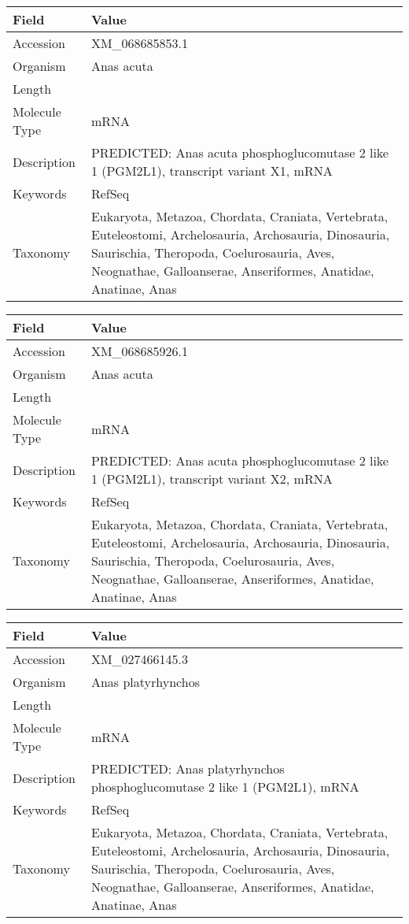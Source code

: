 \documentclass[10pt]{article}
\begin{document}
\vspace{1em}
{\footnotesize
\begin{longtable}{>{\raggedright\arraybackslash}p{4.5cm} >{\raggedright\arraybackslash}p{11.5cm}}
\textbf{Field} & \textbf{Value} \\
\hline
Accession & XM\_068685853.1 \\
Organism & Anas acuta \\
Length & 6369 \\
Molecule Type & mRNA \\
Description & PREDICTED: Anas acuta phosphoglucomutase 2 like 1 (PGM2L1), transcript variant X1, mRNA \\
Keywords & RefSeq \\
Taxonomy & Eukaryota, Metazoa, Chordata, Craniata, Vertebrata, Euteleostomi, Archelosauria, Archosauria, Dinosauria, Saurischia, Theropoda, Coelurosauria, Aves, Neognathae, Galloanserae, Anseriformes, Anatidae, Anatinae, Anas \\
\end{longtable}
}

\vspace{1em}
{\footnotesize
\begin{longtable}{>{\raggedright\arraybackslash}p{4.5cm} >{\raggedright\arraybackslash}p{11.5cm}}
\textbf{Field} & \textbf{Value} \\
\hline
Accession & XM\_068685926.1 \\
Organism & Anas acuta \\
Length & 6180 \\
Molecule Type & mRNA \\
Description & PREDICTED: Anas acuta phosphoglucomutase 2 like 1 (PGM2L1), transcript variant X2, mRNA \\
Keywords & RefSeq \\
Taxonomy & Eukaryota, Metazoa, Chordata, Craniata, Vertebrata, Euteleostomi, Archelosauria, Archosauria, Dinosauria, Saurischia, Theropoda, Coelurosauria, Aves, Neognathae, Galloanserae, Anseriformes, Anatidae, Anatinae, Anas \\
\end{longtable}
}

\vspace{1em}
{\footnotesize
\begin{longtable}{>{\raggedright\arraybackslash}p{4.5cm} >{\raggedright\arraybackslash}p{11.5cm}}
\textbf{Field} & \textbf{Value} \\
\hline
Accession & XM\_027466145.3 \\
Organism & Anas platyrhynchos \\
Length & 6371 \\
Molecule Type & mRNA \\
Description & PREDICTED: Anas platyrhynchos phosphoglucomutase 2 like 1 (PGM2L1), mRNA \\
Keywords & RefSeq \\
Taxonomy & Eukaryota, Metazoa, Chordata, Craniata, Vertebrata, Euteleostomi, Archelosauria, Archosauria, Dinosauria, Saurischia, Theropoda, Coelurosauria, Aves, Neognathae, Galloanserae, Anseriformes, Anatidae, Anatinae, Anas \\
\end{longtable}
}
\end{document}
